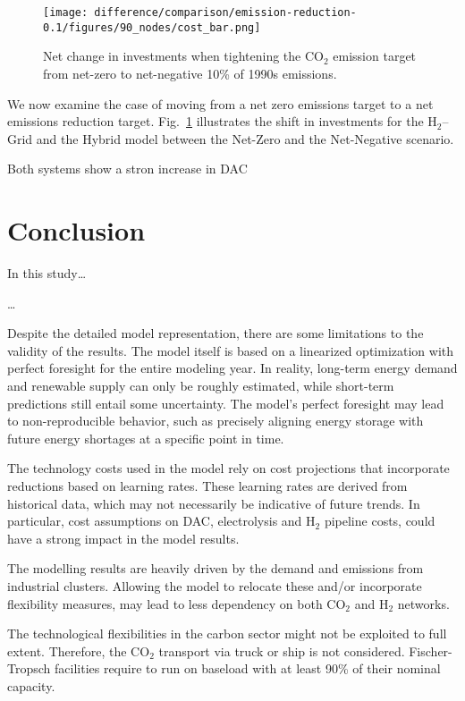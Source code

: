 \documentclass[twocolumn]{article}
\newcommand{\carbon}{CO$_2$}
\newcommand{\hydrogen}{H$_2$}
\newcommand{\hydrogengrid}{\hydrogen{}--Grid}
\begin{document}
\begin{figure}[htb!]
    \centering
    \texttt{[image: difference/comparison/emission-reduction-0.1/figures/90\_nodes/cost\_bar.png]}
    \caption[short]{Net change in investments when tightening the \carbon{} emission target from net-zero to net-negative 10\% of 1990s emissions.}
    \label{fig:net-negative_cost_bar}
\end{figure}


We now examine the case of moving from a net zero emissions target to a net emissions reduction target. Fig.~\ref{fig:net-negative_cost_bar} illustrates the shift in investments for the \hydrogengrid{} and the Hybrid model between the Net-Zero and the Net-Negative scenario.

Both systems show a stron increase in DAC


\section{Conclusion}
\label{sec:conclusion}



In this study\dots

\dots

Despite the detailed model representation, there are some limitations to the validity of the results. The model itself is based on a linearized optimization with perfect foresight for the entire modeling year. In reality, long-term energy demand and renewable supply can only be roughly estimated, while short-term predictions still entail some uncertainty. The model's perfect foresight may lead to non-reproducible behavior, such as precisely aligning energy storage with future energy shortages at a specific point in time.

The technology costs used in the model rely on cost projections that incorporate reductions based on learning rates. These learning rates are derived from historical data, which may not necessarily be indicative of future trends. In particular, cost assumptions on DAC, electrolysis and \hydrogen{} pipeline costs, could have a strong impact in the model results.

The modelling results are heavily driven by the demand and emissions from industrial clusters. Allowing the model to relocate these and/or incorporate flexibility measures, may lead to less dependency on both \carbon{} and \hydrogen{} networks.

The technological flexibilities in the carbon sector might not be exploited to full extent. Therefore, the \carbon{} transport via truck or ship is not considered. Fischer-Tropsch facilities require to run on baseload with at least 90\% of their nominal capacity.
\end{document}

